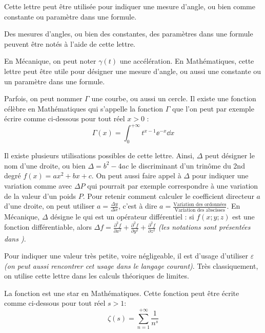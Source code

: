 
\cadre{$\alpha$} Cette lettre peut être utilisée pour indiquer une mesure d'angle, ou bien comme constante ou paramètre dans une formule.

\cadre{$\beta$} Des mesures d'angles, ou bien des constantes, des paramètres dans une formule peuvent être notés à l'aide de cette lettre.

\cadre{$\gamma$} En Mécanique, on peut noter $\gamma(t)$ une accélération. En Mathématiques, cette lettre peut être utile pour désigner une mesure d'angle, ou aussi une constante ou un paramètre dans une formule.

\cadre{$\Gamma$} Parfois, on peut nommer $\Gamma$ une courbe, ou aussi un cercle. Il existe une fonction célèbre en Mathématiques qui s'appelle la fonction $\Gamma$ que l'on peut par exemple écrire comme ci-dessous pour tout réel $x > 0$ :
\begin{equation}
	\Gamma(x) = \int_{0}^{+\infty} t^{x-1} \ee^{-x} \dd x
\end{equation}

\cadre{$\Delta$} Il existe plusieurs utilisations possibles de cette lettre. Ainsi, $\Delta$ peut désigner le nom d'une droite, ou bien $\Delta = b^ 2 - 4 a c$ le discriminant d’un trinôme du 2nd degré $f(x) = a x^2 + b x + c$. On peut aussi faire appel à $\Delta$ pour indiquer une variation comme avec $\Delta P$ qui pourrait par exemple correspondre à une variation de la valeur d'un poids $P$.
Pour retenir comment calculer le coefficient directeur $a$ d'une droite, on peut utiliser $a = \frac{\Delta y}{\Delta x}$, c'est à dire $a = \frac{ \text{Variation des ordonnées} }{ \text{Variation des abscisses} }$.
En Mécanique, $\Delta$ désigne le  qui est un opérateur différentiel : si $f(x;y;z)$ est une fonction différentiable, alors $\Delta f =\frac{\partial^{2} f}{\partial x^{2}} + \frac{\partial^{2} f}{\partial y^{2}} + \frac{\partial^{2} f}{\partial z^{2}}$ \emph{(les notations sont présentées dans  \pageref{partialDer})}.

\cadre{$\varepsilon$} Pour indiquer une valeur très petite, voire négligeable, il est d'usage d'utiliser $\varepsilon$ \emph{(on peut aussi rencontrer cet usage dans le langage courant)}. Très classiquement, on utilise cette lettre dans les calculs théoriques de limites.

\cadre{$\zeta$} La fonction  est une star en Mathématiques. Cette fonction peut être écrite comme ci-dessous pour tout réel $s > 1$:
\begin{equation}
	\zeta(s) = \sum_{n=1}^{+\infty} \frac{1}{n^s}
\end{equation}

